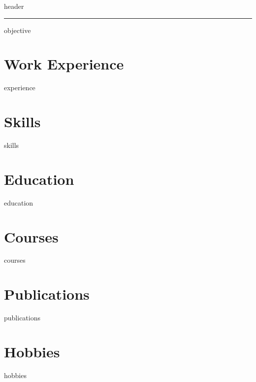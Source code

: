 \documentclass[letter,12pt]{article}
\def\primaryColorToUse{*}
\begin{document}
{header}


\noindent\rule{16cm}{0.4pt}


{objective}
\vspace*{7pt}





\section{\textcolor{\primaryColorToUse}{Work Experience}}
\vspace*{5pt}
{experience}
\vspace*{7pt}

\section{\textcolor{\primaryColorToUse}{Skills}}
\vspace*{5pt}
{skills}
\vspace*{7pt}

\section{\textcolor{\primaryColorToUse}{Education}}
\vspace*{5pt}
{education}
\vspace*{7pt}

\section{\textcolor{\primaryColorToUse}{Courses}}
\vspace*{5pt}
{courses}
\vspace*{7pt}

\section{\textcolor{\primaryColorToUse}{Publications}}
\vspace*{5pt}
{publications}
\vspace*{7pt}

\section{\textcolor{\primaryColorToUse}{Hobbies}}
{hobbies}
\end{document}
